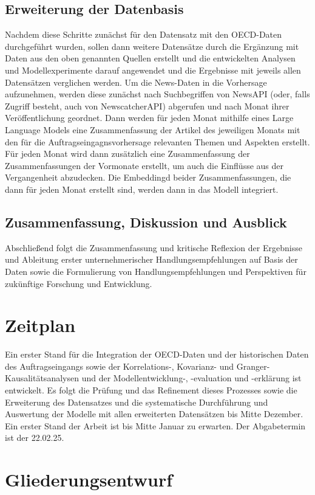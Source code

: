\documentclass[lettersize,journal]{IEEEtran}
\begin{document}
\subsection*{Erweiterung der Datenbasis} Nachdem diese Schritte zunächst für den Datensatz mit den OECD-Daten durchgeführt wurden, sollen dann weitere Datensätze durch die Ergänzung mit Daten aus den oben genannten Quellen erstellt und die entwickelten Analysen und Modellexperimente darauf angewendet und die Ergebnisse mit jeweils allen Datensätzen verglichen werden. Um die News-Daten in die Vorhersage aufzunehmen, werden diese zunächst nach Suchbegriffen von NewsAPI (oder, falls Zugriff besteht, auch von NewscatcherAPI) abgerufen und nach Monat ihrer Veröffentlichung geordnet. Dann werden für jeden Monat mithilfe eines Large Language Models eine Zusammenfassung der Artikel des jeweiligen Monats mit den für die Auftragseingagnsvorhersage relevanten Themen und Aspekten erstellt. Für jeden Monat wird dann zusätzlich eine Zusammenfassung der Zusammenfassungen der Vormonate erstellt, um auch die Einflüsse aus der Vergangenheit abzudecken. Die Embeddingd beider Zusammenfassungen, die dann für jeden Monat erstellt sind, werden dann in das Modell integriert.
\subsection*{Zusammenfassung, Diskussion und Ausblick} Abschließend folgt die Zusammenfassung und kritische Reflexion der Ergebnisse und Ableitung erster unternehmerischer Handlungsempfehlungen auf Basis der Daten sowie die Formulierung von Handlungsempfehlungen und Perspektiven für zukünftige Forschung und Entwicklung.

\section{Zeitplan}
Ein erster Stand für die Integration der OECD-Daten und der historischen Daten des Auftragseingangs sowie der Korrelations-, Kovarianz- und Granger-Kausalitätsanalysen und der Modellentwicklung-, -evaluation und -erklärung ist entwickelt. Es folgt die Prüfung und das Refinement dieses Prozesses sowie die Erweiterung des Datensatzes und die systematische Durchführung und Auswertung der Modelle mit allen erweiterten Datensätzen bis Mitte Dezember. Ein erster Stand der Arbeit ist bis Mitte Januar zu erwarten. Der Abgabetermin ist der 22.02.25.



\section{Gliederungsentwurf}
\end{document}
